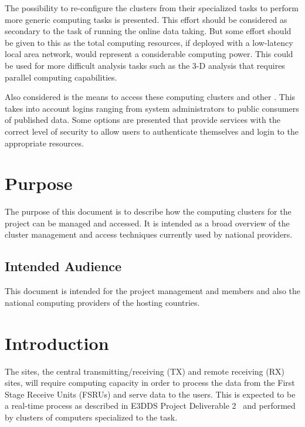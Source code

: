 \documentclass[12pt,a4paper]{article}
\begin{document}
The possibility to re-configure the clusters from their specialized tasks to perform more generic computing tasks is presented.
This effort should be considered as secondary to the task of running the online data taking.
But some effort should be given to this as the total computing resources, if deployed with a low-latency local area network, would represent a considerable computing power.
This could be used for more difficult analysis tasks such as the 3-D analysis that requires parallel computing capabilities.

Also considered is the means to access these computing clusters and other \ED \newline \einfra.
This takes into account logins ranging from system administrators to public consumers of published data.
Some options are presented that provide services with the correct level of security to allow users to authenticate themselves and login to the appropriate resources.

\section{Purpose} \label{sec:purpose}

The purpose of this document is to describe how the computing clusters for the \ED project can be managed and accessed.
It is intended as a broad overview of the cluster management and access techniques currently used by national \einfra providers.

\subsection{Intended Audience}

This document is intended for the \ED project management and members and also the national computing \einfra providers of the hosting countries.

\section{Introduction} \label{sec:intro}

The \ED sites, the central transmitting/receiving (TX) and remote receiving (RX) sites, will require computing capacity in order to process the data from the First Stage Receive Units (FSRUs) and serve data to the users.
This is expected to be a real-time process as described in E3DDS Project Deliverable 2~\cite{e3dds-del-2} and performed by clusters of computers specialized to the task.
\end{document}
